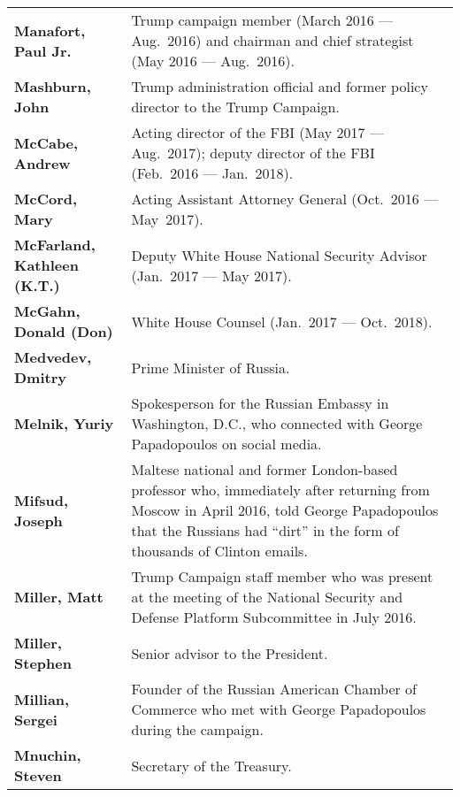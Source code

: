 \begin{longtable}{ p{} p{} }
    \textbf{Manafort, Paul Jr.} & Trump campaign member (March 2016 — Aug.~2016) and chairman and chief strategist (May 2016 — Aug.~2016). \\

    \textbf{Mashburn, John} & Trump administration official and former policy director to the Trump Campaign. \\

    \textbf{McCabe, Andrew} & Acting director of the FBI (May 2017 — Aug.~2017); deputy director of the FBI (Feb.~2016 — Jan.~2018). \\

    \textbf{McCord, Mary} & Acting Assistant Attorney General (Oct.~2016 — May~2017). \\

    \textbf{McFarland, Kathleen (K.T.)} & Deputy White House National Security Advisor (Jan.~2017 — May 2017). \\

    \textbf{McGahn, Donald (Don)} & White House Counsel (Jan.~2017 — Oct.~2018). \\

    \textbf{Medvedev, Dmitry} & Prime Minister of Russia. \\

    \textbf{Melnik, Yuriy} & Spokesperson for the Russian Embassy in Washington, D.C., who connected with George Papadopoulos on social media. \\

    \textbf{Mifsud, Joseph} & Maltese national and former London-based professor who, immediately after returning from Moscow in April 2016, told George Papadopoulos that the Russians had ``dirt'' in the form of thousands of Clinton emails. \\

    \textbf{Miller, Matt} & Trump Campaign staff member who was present at the meeting of the National Security and Defense Platform Subcommittee in July 2016. \\

    \textbf{Miller, Stephen} & Senior advisor to the President.  \\

    \textbf{Millian, Sergei} & Founder of the Russian American Chamber of Commerce who met with George Papadopoulos during the campaign. \\

    \textbf{Mnuchin, Steven} & Secretary of the Treasury. \\


\end{longtable}
